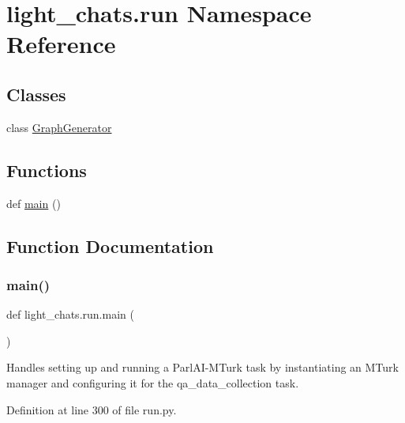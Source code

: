\hypertarget{namespacelight__chats_1_1run}{}\section{light\+\_\+chats.\+run Namespace Reference}
\label{namespacelight__chats_1_1run}
\subsection*{Classes}
\begin{DoxyCompactItemize}
\item 
class \hyperlink{classlight__chats_1_1run_1_1GraphGenerator}{Graph\+Generator}
\end{DoxyCompactItemize}
\subsection*{Functions}
\begin{DoxyCompactItemize}
\item 
def \hyperlink{namespacelight__chats_1_1run_a1966c0bed443d10aceaa1729e5f1950c}{main} ()
\end{DoxyCompactItemize}


\subsection{Function Documentation}
\mbox{\label{namespacelight__chats_1_1run_a1966c0bed443d10aceaa1729e5f1950c}} 
\subsubsection{\texorpdfstring{main()}{main()}}
{\footnotesize\ttfamily def light\+\_\+chats.\+run.\+main (\begin{DoxyParamCaption}{ }\end{DoxyParamCaption})}

\begin{DoxyVerb}Handles setting up and running a ParlAI-MTurk task by instantiating an MTurk manager
and configuring it for the qa_data_collection task.
\end{DoxyVerb}
 

Definition at line 300 of file run.\+py.


